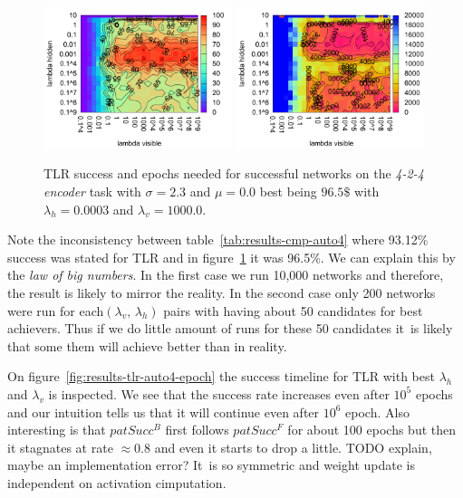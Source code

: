 \begin{figure}[H]
  \centering
  \includegraphics[width=0.49\textwidth]{img/tlr-auto4-success.pdf}   
  \includegraphics[width=0.49\textwidth]{img/tlr-auto4-epoch.pdf}     
  \caption{TLR success and epochs needed for successful networks on the \emph{4-2-4 encoder} task with $\sigma = 2.3$ and $\mu = 0.0$ best being $96.5\$$ with $\lambda_h=0.0003$ and $\lambda_v=1000.0$.}
  \label{fig:results-tlr-auto4-performance}
\end{figure}

Note the inconsistency between table~\ref{tab:results-cmp-auto4} where 93.12\% success was stated for TLR and in figure~\ref{fig:results-tlr-auto4-performance} it was 96.5\%. We can explain this by the \emph{law of big numbers}. In the first case we run 10,000 networks and therefore, the result is likely to mirror the reality. In the second case only 200 networks were run for each$(\lambda_v,\,\lambda_h)$ pairs with having about 50 candidates for best achievers. Thus if we do little amount of runs for these 50 candidates it~is likely that some them will achieve better than in reality. 

On figure~\ref{fig:results-tlr-auto4-epoch} the success timeline for TLR with best $\lambda_h$ and $\lambda_v$ is inspected. We see that the success rate increases even after $10^5$ epochs and our intuition tells us that it will continue even after $10^6$ epoch. Also interesting is that $patSucc^B$ first follows $patSucc^F$ for about 100 epochs but then it stagnates at rate $\approx0.8$ and even it starts to drop a little. TODO explain, maybe an implementation error? It~is so symmetric and weight update is independent on activation cimputation. 

